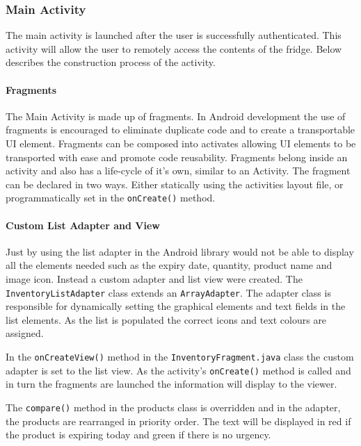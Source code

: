 \documentclass[a4paper, 11pt]{article}
\begin{document}
\vspace{\baselineskip}

\subsubsection{Main Activity}
The main activity is launched after the user is successfully authenticated. This activity will allow the user to remotely access the contents of the fridge. Below describes the construction process of the activity. 

\paragraph{Fragments} The Main Activity is made up of fragments. In Android development the use of fragments is encouraged to eliminate duplicate code and to create a transportable UI element. Fragments can be composed into activates allowing UI elements to be transported with ease and promote code reusability. Fragments belong inside an activity and also has a life-cycle of it's own, similar to an Activity. The fragment can be declared in two ways. Either statically using the activities layout file, or programmatically set in the \texttt{onCreate()} method.  	

\paragraph{Custom List Adapter and View} 
Just by using the list adapter in the Android library would not be able to display all the elements needed such as the expiry date, quantity, product name and image icon. Instead a custom adapter and list view were created. The \texttt{InventoryListAdapter} class extends an \texttt{ArrayAdapter}. The adapter class is responsible for dynamically setting the graphical elements and text fields in the list elements. As the list is populated the correct icons and text colours are assigned.

In the \texttt {onCreateView()} method in the \texttt{InventoryFragment.java} class the custom adapter is set to the list view. As the activity's \texttt{onCreate()} method is called and in turn the fragments are launched the information will display to the viewer. 

The \texttt{compare()} method in the products class is overridden and in the adapter, the products are rearranged in priority order. The text will be displayed in red if the product is expiring today and green if there is no urgency. 
\end{document}

